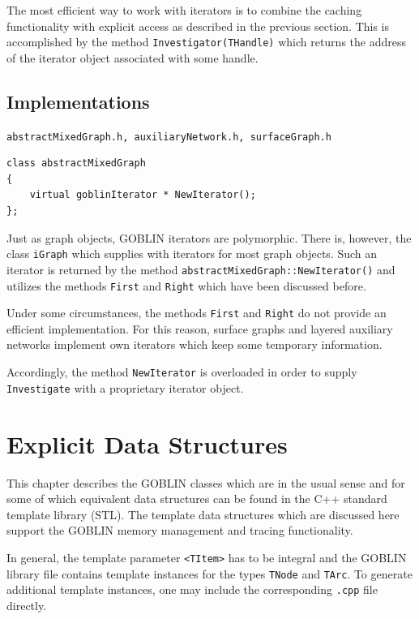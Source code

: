 \documentclass[a4paper,11pt,twoside]{book}
\begin{document}
\begin{multicols}{2}
The most efficient way to work with iterators is to combine the caching
functionality with explicit access as described in the previous section.
This is accomplished by the method \verb/Investigator(THandle)/ which returns the
address of the iterator object associated with some handle.


\section{Implementations}
\myincludes\verb/abstractMixedGraph.h, auxiliaryNetwork.h, surfaceGraph.h/
\begin{mymethods}
\begin{verbatim}
class abstractMixedGraph
{
    virtual goblinIterator * NewIterator();
};
\end{verbatim}
\end{mymethods}
Just as graph objects, GOBLIN iterators are polymorphic. There is, however,
the class \verb/iGraph/ which supplies with iterators for most graph
objects. Such an iterator is returned by the method
\verb/abstractMixedGraph::NewIterator()/ and utilizes the methods \verb/First/
and \verb/Right/ which have been discussed before.

Under some circumstances, the methods \verb/First/ and \verb/Right/ do not
provide an efficient implementation. For this reason, surface graphs and
layered auxiliary networks implement own iterators which keep some temporary
information.

Accordingly, the method \verb/NewIterator/ is overloaded in order to supply
\verb/Investigate/ with a proprietary iterator object.



\cleardoublepage
{}
\chapter{Explicit Data Structures}
\thispagestyle{fancy}
\label{clb4}

This chapter describes the GOBLIN classes which are  in
the usual sense and for some of which equivalent data structures can be found
in the C++ standard template library (STL). The template data structures which
are discussed here support the GOBLIN memory management and tracing
functionality.

In general, the template parameter \verb/<TItem>/ has to be integral and the
GOBLIN library file contains template instances for the types \verb/TNode/ and
\verb/TArc/. To generate additional template instances, one may include the
corresponding \verb/.cpp/ file directly.


\end{multicols}
\end{document}
